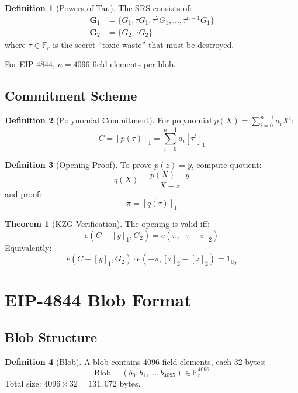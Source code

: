 \documentclass[11pt,a4paper]{article}
\theoremstyle{definition}
\newtheorem{definition}{Definition}
\newtheorem{theorem}{Theorem}
\begin{document}
\begin{definition}[Powers of Tau]
    The SRS consists of:
    \begin{align}
        \mathbf{G}_1 &= \{G_1, \tau G_1, \tau^2 G_1, \ldots, \tau^{n-1} G_1\} \\
        \mathbf{G}_2 &= \{G_2, \tau G_2\}
    \end{align}
    where $\tau \in \mathbb{F}_r$ is the secret ``toxic waste'' that must be destroyed.
\end{definition}

For EIP-4844, $n = 4096$ field elements per blob.

\subsection{Commitment Scheme}

\begin{definition}[Polynomial Commitment]
    For polynomial $p(X) = \sum_{i=0}^{n-1} a_i X^i$:
    \[
    C = [p(\tau)]_1 = \sum_{i=0}^{n-1} a_i [\tau^i]_1
    \]
\end{definition}

\begin{definition}[Opening Proof]
    To prove $p(z) = y$, compute quotient:
    \[
    q(X) = \frac{p(X) - y}{X - z}
    \]
    and proof:
    \[
    \pi = [q(\tau)]_1
    \]
\end{definition}

\begin{theorem}[KZG Verification]
    The opening is valid iff:
    \[
    e(C - [y]_1, G_2) = e(\pi, [\tau - z]_2)
    \]
    Equivalently:
    \[
    e(C - [y]_1, G_2) \cdot e(-\pi, [\tau]_2 - [z]_2) = 1_{\mathbb{G}_T}
    \]
\end{theorem}

\section{EIP-4844 Blob Format}

\subsection{Blob Structure}

\begin{definition}[Blob]
    A blob contains 4096 field elements, each 32 bytes:
    \[
    \text{Blob} = (b_0, b_1, \ldots, b_{4095}) \in \mathbb{F}_r^{4096}
    \]
    Total size: $4096 \times 32 = 131,072$ bytes.
\end{definition}
\end{document}
